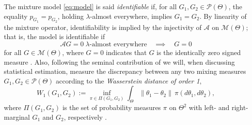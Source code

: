 \documentclass[11pt,twoside]{article} %
\begin{document}
The mixture model \eqref{eq:model} is said \emph{identifiable} if, for all $G_1,G_2\in\mathcal P(\Theta)$, the equality $p_{G_1}=p_{G_2}$, holding $\lambda$-almost everywhere, implies $G_1=G_2$. By linearity of the mixture operator,  identifiability is implied by the injectivity of $\mathcal A$ on $\mathcal M(\Theta)$; that is, the model is identifiable if
%
\begin{equation*}
    \mathcal AG=0 \;\lambda\text{-almost everywhere} \quad\implies\quad G=0
\end{equation*}
%
for all $G\in\mathcal M(\Theta)$, where $G = 0$ indicates that $G$ is the identically zero signed measure . Also, following the seminal contribution of \cite{Nguyen-13} we will, when discussing statistical estimation, measure the discrepancy between any two mixing measures $G_1,G_2\in\mathcal P(\Theta)$ according to the \emph{Wasserstein distance of order 1},
%
\begin{equation*}
    W_1(G_1,G_2):=\inf_{\pi\in\Pi(G_1,G_2)} \int_\Theta \|\theta_1-\theta_2\|\,\pi(d\theta_1,d\theta_2),
\end{equation*}
%
where $\Pi(G_1,G_2)$ is the set of probability measures $\pi$ on $\Theta^2$ with left- and right-marginal $G_1$ and $G_2$, respectively \citep{Villani-09}.


\end{document}
